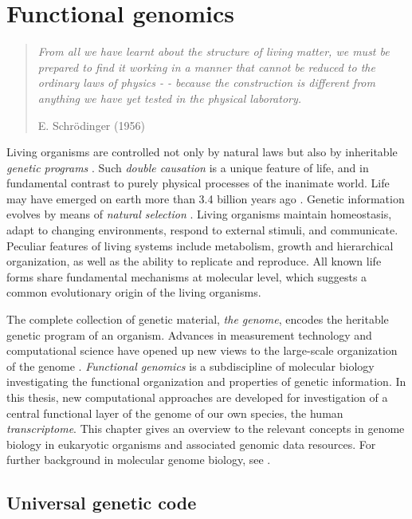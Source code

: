 \chapter{Functional genomics}\label{ch:bio}

\begin{quotation}
\emph{From all we have learnt about the structure of living matter, we
must be prepared to find it working in a manner that cannot be reduced
to the ordinary laws of physics - - because the construction is
different from anything we have yet tested in the physical
laboratory.}
\begin{flushright}
E. Schr{\"o}dinger (1956)
\end{flushright}
\end{quotation}

Living organisms are controlled not only by natural laws but also by
inheritable {\it genetic programs} \citep{Mayr04,Schrodinger44}. Such
{\it double causation} is a unique feature of life, and in fundamental
contrast to purely physical processes of the inanimate world. Life may
have emerged on earth more than 3.4 billion years ago
\citep{Schopf2006, Tice2004}. Genetic information evolves by means of
{\it natural selection} \citep{Darwin1859}. Living organisms maintain
homeostasis, adapt to changing environments, respond to external
stimuli, and communicate.  Peculiar features of living systems include
metabolism, growth and hierarchical organization, as well as the
ability to replicate and reproduce. All known life forms share
fundamental mechanisms at molecular level, which suggests a common
evolutionary origin of the living organisms.

The complete collection of genetic material, {\it the genome}, encodes
the heritable genetic program of an organism. Advances in measurement
technology and computational science have opened up new views to the
large-scale organization of the genome
\citep{Carroll03,Lander96}. {\it Functional genomics} is a
subdiscipline of molecular biology investigating the functional
organization and properties of genetic information. In this thesis,
new computational approaches are developed for investigation of a
central functional layer of the genome of our own species, the human
{\it transcriptome}. This chapter gives an overview to the relevant
concepts in genome biology in eukaryotic organisms and associated
genomic data resources. For further background in molecular genome
biology, see \cite{Alberts02, Brown06}.

\section{Universal genetic code}

